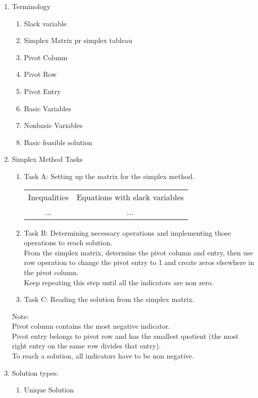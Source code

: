 \documentclass[12pt]{amsart}
\begin{document}
\begin{enumerate}

\item Terminology

	\begin{enumerate}
		\item Slack variable 
		
		\item Simplex Matrix pr simplex tableau
		
		\item Pivot Column
		
		\item Pivot Row
		
		
		\item Pivot Entry
		
		\item Basic Variables
		
		\item Nonbasic Variables
		
		\item Basic feasible solution
		
	\end{enumerate}
\item Simplex Method Tasks
	\begin{enumerate}
		\item Task A: Setting up the matrix for the simplex method.\\
			\begin{tabular}{|c|c|}
			\hline
			Inequalities & Equations with slack variables \\
			 ... & ... \\
			\hline
			\end{tabular}
			
		\item Task B: Determining necessary operations and implementing those operations to reach solution. \\
			From the simplex matrix, determine the pivot column and entry, then use row operation to change the pivot entry to 1 and create zeros elsewhere in the pivot column. \\
			Keep repeating this step until all the indicators are non zero. \\
		\item Task C: Reading the solution from the simplex matrix. 
	\end{enumerate}
		Note: \\
		Pivot column contains the most negative indicator.\\
		Pivot entry belongs to pivot row and has the smallest quotient (the most right entry on the same row divides that entry).\\
		To reach a solution, all indicators have to be non negative. \\
\item Solution types: 
	\begin{enumerate}
		\item Unique Solution
		

\end{enumerate}
\end{enumerate}
\end{document}
